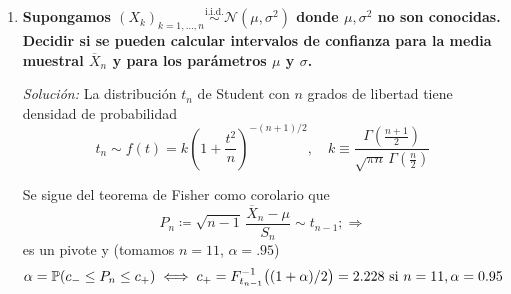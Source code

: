 \begin{enumerate}
  \smallskip
  \noindent\emph{Solución:} Construimos un pivote usando el Teorema de Fisher:
  \[ \Theta \equiv S_n^2 = \frac{1}{n} \sum_{k=1}^{n} (X_k-\mu) \equiv \frac{\sigma^2}{n} \, P_n\]
  \[
    P_n \coloneqq \sum_{i=1}^n \frac{(X_i - \overline{X}_n)^2}{\sigma^2} \equiv \frac{(n-1)S_n^2}{\sigma^2} \sim \chi_{n-1}^2
  \]
  Luego
\[
  P_n = (n/\sigma^2)\Theta \equiv g(\Theta; \sigma^2) \implies g(x, \theta) \coloneqq (n/\theta)x;
\]
y
\[
  \Prob(P_n \in (c_-, c_+)) = \alpha \iff 2F_{\chi^2(n-1)}(c_+) - 1 = \alpha \iff c_+ = F_{\chi^2(n-1)}^{-1}(1 + \alpha)/2)
\]
\[
  = \Prob\!\left(c_- \leq \frac{n}{\sigma^2}\Theta \leq c_+\right) = \Prob(a_- \leq \Theta \leq a_+); \quad \text{donde } a_\pm = (\sigma^2/n)c_\pm
\]
\[
  \alpha = \Prob(n\Theta/c_+ \leq \sigma^2 \leq n\Theta/c_-)
\]
  \begin{enumerate}[label=(\alph*)]
    \item El intervalo de confianza para la varianza muestral es $(a_-, a_+)$ donde $a_\pm = \frac{\sigma^2}{n-1}c_\pm$ (o $\frac{\sigma^2}{n}c_\pm$ según la convención del pivote).
    \item El intervalo de confianza para $\sigma^2$ es $\left(\frac{(n-1)S_n^2}{c_+},\, \frac{(n-1)S_n^2}{c_-}\right)$ (o $\left(\frac{n S_n^2}{c_+},\, \frac{n S_n^2}{c_-}\right)$ según la convención del pivote), donde $S_n^2$ se obtiene a partir de la muestra.
  \end{enumerate}

  \item \textbf{Supongamos $(X_k)_{k=1,\dots,n} \stackrel{\text{i.i.d.}}{\sim} \mathcal{N}(\mu, \sigma^2)$ donde $\mu, \sigma^2$ no son conocidas. Decidir si se pueden calcular intervalos de confianza para la media muestral $\overline{X}_n$ y para los parámetros $\mu$ y $\sigma$.}

  \smallskip
  \noindent\emph{Solución:} La distribución $t_n$ de Student con $n$ grados de libertad tiene densidad de probabilidad
  \[
    t_n \sim f(t) = k\left(1 + \frac{t^2}{n}\right)^{-(n+1)/2}, \quad k \equiv \frac{\Gamma\left(\frac{n+1}{2}\right)}{\sqrt{\pi n}\,\Gamma\left(\frac{n}{2}\right)}
  \]

  Se sigue del teorema de Fisher como corolario que
  \[
    P_n \coloneqq \sqrt{n-1}\,\frac{\overline{X}_n - \mu}{S_n} \sim t_{n-1}; \Rightarrow
  \]
  es un pivote y (tomamos $n = 11$, $\alpha = .95$)
  \[
    \alpha = \mathbb{P}(c_- \leq P_n \leq c_+) \iff c_+ = F_{t_{n-1}}^{-1}\bigl((1 + \alpha)/2\bigr) = 2.228 \text{ si } n = 11, \alpha = 0.95
  \]


\end{enumerate}
